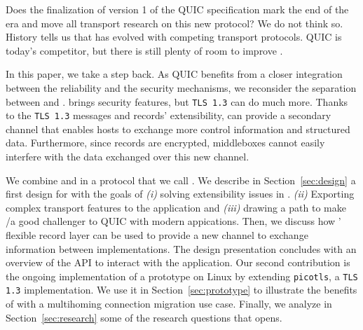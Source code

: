 Does the finalization of version 1 of the QUIC specification mark the
end of the \tcp era and move all transport research on this new protocol?
We do not think so. History tells us that \tcp has evolved with competing
transport protocols. QUIC is today's competitor, but there is still plenty of
room to improve \tcp.

In this paper, we take a step back. As QUIC benefits from a closer
integration between the reliability and the security mechanisms, we
reconsider the separation between \tcp and \tls.
\tls brings security features, but \texttt{TLS 1.3} can do much more.
Thanks to the \texttt{TLS 1.3} messages and records' extensibility,
\tls can provide a secondary channel that enables hosts to exchange
more control information and structured data.
Furthermore, since \tls records are encrypted, middleboxes
cannot easily interfere with the data exchanged over this new
channel.

We combine \tcp and \tls in a protocol that we call \textbf{\tcpls}. We describe
in Section~\ref{sec:design} a first design for \tcpls with the goals of
\textit{(i)}
solving extensibility issues in \tcp. \textit{(ii)} Exporting complex transport features to
the application and \textit{(iii)} drawing a path to make \tcp/\tls a good challenger to QUIC
with modern appications. Then, we discuss how \tls' flexible record layer can be
used to provide a new channel to exchange information between \tcpls
implementations. The design presentation concludes with an overview of the API
to interact with the application.  Our second contribution is the ongoing
implementation of a \tcpls prototype on Linux by extending \texttt{picotls}, a
\texttt{TLS 1.3}
implementation.  We use it in Section~\ref{sec:prototype} to illustrate the
benefits of \tcpls with a multihoming connection migration use case. Finally, we
analyze in Section~\ref{sec:research} some of the research questions that \tcpls
opens.





